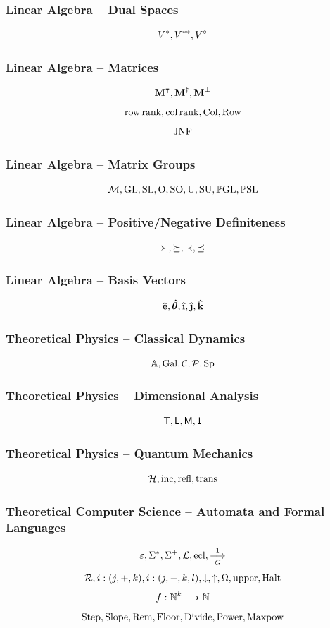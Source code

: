 \documentclass{beamer}
\begin{document}
\begin{frame}
    \frametitle{Linear Algebra -- Dual Spaces}
    \[
        V^{\ast}, V^{\ast\ast}, V^{\circ}
    \]
\end{frame}

\begin{frame}
    \frametitle{Linear Algebra -- Matrices}
    \[
        \vb{M}^{\intercal}, \vb{M}^{\dagger}, \vb{M}^{\perp}
    \]
    \[
        \operatorname{row\,rank}, \operatorname{col\,rank}, \operatorname{Col}, \operatorname{Row}
    \]
    \[
        \operatorname{JNF}
    \]
\end{frame}

\begin{frame}
    \frametitle{Linear Algebra -- Matrix Groups}
    \[
        \mathcal{M}, \operatorname{GL}, \operatorname{SL}, \operatorname{O}, \operatorname{SO}, \operatorname{U}, \operatorname{SU}, \mathbb{P}\mathrm{GL}, \mathbb{P}\mathrm{SL}
    \]
\end{frame}


\begin{frame}
    \frametitle{Linear Algebra -- Positive/Negative Definiteness}
    \[
        \succ, \succeq, \prec, \preceq
    \]
\end{frame}

\begin{frame}
    \frametitle{Linear Algebra -- Basis Vectors}
    \[
        \unitv{e}, \unitv*{\theta}, \ihat, \jhat, \khat
    \]
\end{frame}

\begin{frame}
    \frametitle{Theoretical Physics -- Classical Dynamics}
    \[
        \mathbb{A}, \operatorname{Gal}, \mathcal{C}, \mathcal{P}, \operatorname{Sp}
    \]
\end{frame}

\begin{frame}
    \frametitle{Theoretical Physics -- Dimensional Analysis}
    \[
        \mathsf{T}, \mathsf{L}, \mathsf{M}, \mathsf{1}
    \]
\end{frame}

\begin{frame}
    \frametitle{Theoretical Physics -- Quantum Mechanics}
    \[
        \mathcal{H}, \text{inc}, \text{refl}, \text{trans}
    \]
    
\end{frame}

\begin{frame}
    \frametitle{Theoretical Computer Science -- Automata and Formal Languages}
    \[
        \emptyword, \Sigma\kstar, \Sigma\kplus, \langacc, \ecl, \prodrule[1][G]
    \]
    \[
        \registerMachine, \sPlus{i}{j}{k}, \sMinus{i}{j}{k}{l}, \halt, \nothalt, \haltingSet, \upper, \Halt
    \]
    \[
        f: \mathbb{N}^k \dashrightarrow \mathbb{N}
    \]
    \[
        \operatorname{Step}, \operatorname{Slope}, \operatorname{Rem}, \operatorname{Floor}, \operatorname{Divide}, \operatorname{Power}, \operatorname{Maxpow}
    \]
\end{frame}
\end{document}
